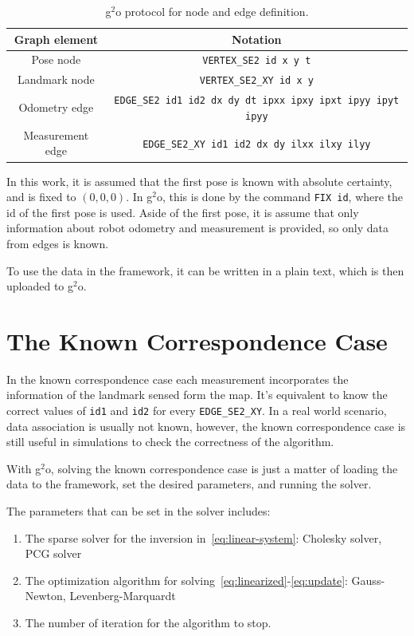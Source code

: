 \begin{table}[htbp!]
    \centering
    \begin{tabular}{|c|c|}
        \hline
        Graph element & Notation\\
        \hline
        Pose node & \texttt{VERTEX\_SE2 id x y t}\\
        Landmark node & \texttt{VERTEX\_SE2\_XY id x y}\\
        Odometry edge & \texttt{EDGE\_SE2 id1 id2 dx dy dt ipxx ipxy ipxt ipyy ipyt ipyy}\\
        Measurement edge & \texttt{EDGE\_SE2\_XY id1 id2 dx dy ilxx ilxy ilyy}\\
        \hline
    \end{tabular}
    \caption{g$^2$o protocol for node and edge definition.}
    \label{tab:protocol}
\end{table}

In this work, it is assumed that the first pose is known with absolute certainty, and is fixed to $(0,0,0)$. In g$^2$o, this is done by the command \texttt{FIX id}, where the id of the first pose is used. Aside of the first pose, it is assume that only information about robot odometry and measurement is provided, so only data from edges is known. 

To use the data in the framework, it can be written in a plain text, which is then uploaded to g$^2$o.

\section{The Known Correspondence Case}
\label{sec:known-asso-imp}

In the known correspondence case each measurement incorporates the information of the landmark sensed form the map. It's equivalent to know the correct values of \texttt{id1} and \texttt{id2} for every \texttt{EDGE\_SE2\_XY}. In a real world scenario, data association is usually not known, however, the known correspondence case is still useful in simulations to check the correctness of the algorithm.

With g$^2$o, solving the known correspondence case is just a matter of loading the data to the framework, set the desired parameters, and running the solver. 

The parameters that can be set in the solver includes: 

\begin{enumerate}
    \item The sparse solver for the inversion in~\eqref{eq:linear-system}: Cholesky solver, PCG solver
    \item The optimization algorithm for solving~\eqref{eq:linearized}-\eqref{eq:update}: Gauss-Newton, Levenberg-Marquardt
    \item The number of iteration for the algorithm to stop.
\end{enumerate}

